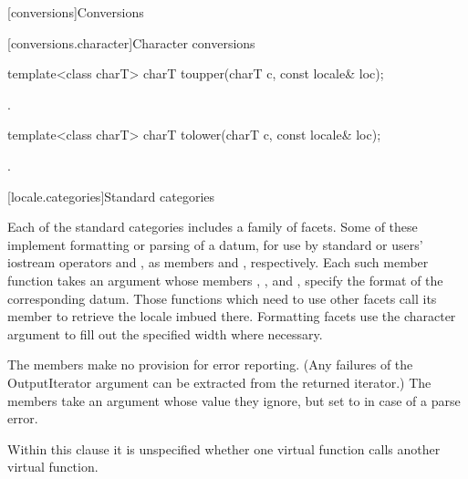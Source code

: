 [conversions]{Conversions}

[conversions.character]{Character conversions}

%
\begin{itemdecl}
template<class charT> charT toupper(charT c, const locale& loc);
\end{itemdecl}

\begin{itemdescr}
\pnum
\returns
{}.
\end{itemdescr}

%
\begin{itemdecl}
template<class charT> charT tolower(charT c, const locale& loc);
\end{itemdecl}

\begin{itemdescr}
\pnum
\returns
{}.
\end{itemdescr}

[locale.categories]{Standard  categories}

\pnum
Each of the standard categories includes a family of facets.
Some of these implement formatting or parsing of a datum, for use
by standard or users' iostream operators
\tcode{<<} and \tcode{>>},
as members
and
,
respectively.
Each such member function takes an
%
argument whose members
%
,
%
,
and
%
,
specify the format of the corresponding datum.
Those functions which need to use other facets call its member
to retrieve the locale imbued there.
Formatting facets use the character argument
to fill out the specified width where necessary.

\pnum
The
members make no provision for error reporting.
(Any failures of the
OutputIterator argument can be extracted from the returned iterator.)
The
members take an
argument whose value they ignore, but set to
in case of a parse error.

\pnum
Within this clause it is unspecified whether one virtual function calls another
virtual function.

